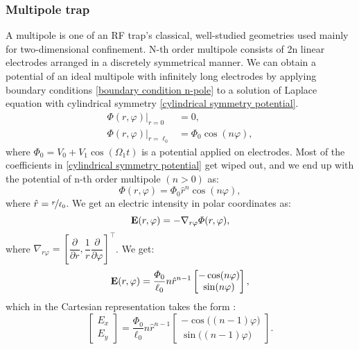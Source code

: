 \subsubsection{Multipole trap}

A multipole is one of an RF trap's classical, well-studied geometries used mainly for two-dimensional confinement. N-th order multipole consists of 2n linear electrodes arranged in a discretely symmetrical manner. We can obtain a potential of an ideal multipole with infinitely long electrodes by applying boundary conditions \eqref{boundary condition n-pole} to a solution of Laplace equation with cylindrical symmetry \eqref{cylindrical symmetry potential}.
\begin{subequations}
\label{boundary condition n-pole}
\begin{align}
	\Phi(r,\varphi)\vert_{r=0}&=0, \\
	\Phi(r,\varphi)\vert_{r=\ell_0}&=\Phi_0 \cos(n\varphi),
\end{align}
\end{subequations}
where $\Phi_0 = V_0 + V_1 \cos(\Omega_1 t)$ is a potential applied on electrodes. Most of the coefficients in \eqref{cylindrical symmetry potential} get wiped out, and we end up with the potential of n-th order multipole $(n > 0)$ as:
\begin{equation}
	\label{potential n-pole}
	\Phi(r,\varphi) = \Phi_0 \hat{r}^n \cos(n\varphi),	
\end{equation}
where $\hat{r} = \nicefrac{r}{\ell_0}$. We get an electric intensity in polar coordinates as: 
\begin{equation}
	\vb{E}(r,\varphi) = -\nabla_{r\varphi} \Phi(r,\varphi),
\end{equation}
where $\nabla_{r\varphi} = \left[\dfrac{\partial}{\partial r}, \dfrac{1}{r} \dfrac{\partial}{\partial \varphi}\right]^\top$. We get:
\begin{equation}
\label{need this for norm(E_0)}
\vb{E}(r,\varphi) = \dfrac{\Phi_0}{\ell_0} n \hat{r}^{n-1} 
\begin{bmatrix}
	-\cos(n\varphi) \\
	\sin(n\varphi)
\end{bmatrix},
\end{equation}
which in the Cartesian representation takes the form \cite{gerlich1992inhomogeneous}:
\begin{equation}
\begin{bmatrix}
	E_x \\
	E_y
\end{bmatrix}
 = \dfrac{\Phi_0}{\ell_0} n \hat{r}^{n-1} 
\begin{bmatrix}
	-\cos\big((n-1)\varphi\big) \\
	\sin\big((n-1)\varphi\big)
\end{bmatrix}.
\end{equation}
